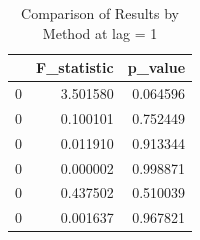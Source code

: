 \begin{table}
\caption{Comparison of Results by Method at lag = 1}
\label{tab:results_by_method}
\begin{tabular}{lrr}
\toprule
 & F\_statistic & p\_value \\
\midrule
0 & 3.501580 & 0.064596 \\
0 & 0.100101 & 0.752449 \\
0 & 0.011910 & 0.913344 \\
0 & 0.000002 & 0.998871 \\
0 & 0.437502 & 0.510039 \\
0 & 0.001637 & 0.967821 \\
\bottomrule
\end{tabular}
\end{table}
